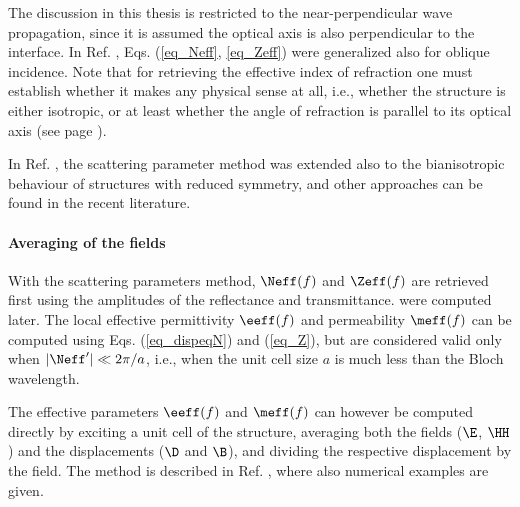 The discussion in this thesis is restricted to the near-perpendicular wave propagation, since it is assumed the optical axis is also perpendicular to the interface. In Ref. \cite{menzel2008retrieving}, Eqs. (\ref{eq_Neff}, \ref{eq_Zeff}) were generalized also for oblique incidence. Note that for retrieving the effective index of refraction one must establish whether it makes any physical sense at all, i.e., whether the structure is either isotropic, or at least whether the angle of refraction is parallel to its optical axis (see page \pageref{indexofrefraction}).

In Ref. \cite{li2009determination}, %
the scattering parameter method was extended also to the bianisotropic behaviour of structures with reduced symmetry, and other approaches can be found \cite{andryieuski2010homogenization} in the recent literature.

\paragraph{Averaging of the fields} %
With the scattering parameters method, $\Neff(f)$ and $\Zeff(f)$ are retrieved first using the amplitudes of the reflectance and transmittance.  were computed later. The  local effective permittivity $\eeff(f)$ and permeability $\meff(f)$ can be  computed using  Eqs. (\ref{eq_dispeqN}) and (\ref{eq_Z}), but are considered valid only when $|\Neff'| \ll 2\pi/a$, i.e., when the unit cell size $a$ is much less than the Bloch wavelength.

The effective parameters $\eeff(f)$ and $\meff(f)$ can however be computed directly by exciting a unit cell of the structure, averaging both the fields ($\E$, $\HH$) and the displacements ($\D$ and $\B$), and dividing the respective displacement by the field. The method is described in Ref. \cite{smith2006homogenization}, where also numerical examples are given. 



